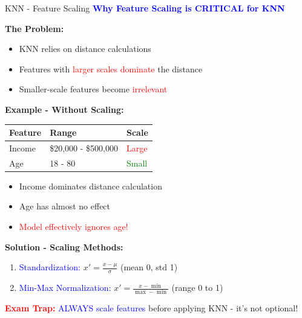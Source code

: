 \documentclass[8pt]{beamer}
\begin{document}
	\begin{frame}{KNN - Feature Scaling}
		\fontsize{6.5}{7.5}\selectfont
		\textcolor{blue}{\textbf{Why Feature Scaling is CRITICAL for KNN}}
		
		\textbf{The Problem:}
		\begin{itemize}
			\item KNN relies on distance calculations
			\item Features with \textcolor{red}{larger scales dominate} the distance
			\item Smaller-scale features become \textcolor{red}{irrelevant}
		\end{itemize}
		
		\textbf{Example - Without Scaling:}
		\begin{tabular}{|p{3cm}|p{3cm}|p{3cm}|}
			\hline
			\textbf{Feature} & \textbf{Range} & \textbf{Scale} \\
			\hline
			Income & \$20,000 - \$500,000 & \textcolor{red}{Large} \\
			\hline
			Age & 18 - 80 & \textcolor{green}{Small} \\
			\hline
		\end{tabular}
		\begin{itemize}
			\item Income dominates distance calculation
			\item Age has almost no effect
			\item \textcolor{red}{Model effectively ignores age!}
		\end{itemize}
		
		\textbf{Solution - Scaling Methods:}
		\begin{enumerate}
			\item \textcolor{blue}{Standardization:} $x' = \frac{x - \mu}{\sigma}$ (mean 0, std 1)
			\item \textcolor{blue}{Min-Max Normalization:} $x' = \frac{x - \min}{\max - \min}$ (range 0 to 1)
		\end{enumerate}
		
		\textcolor{red}{\textbf{Exam Trap:}} \textcolor{blue}{ALWAYS scale features} before applying KNN - it's not optional!
	\end{frame}
	
\end{document}
